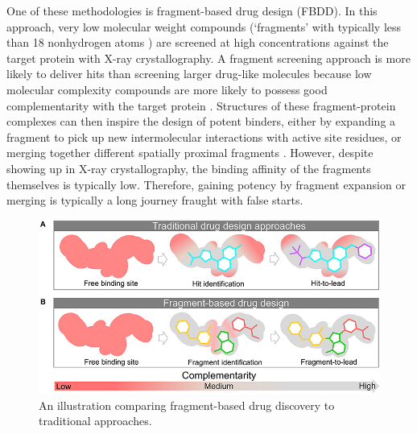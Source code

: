 One of these methodologies is fragment-based drug design (FBDD). In this approach, very low molecular weight compounds (`fragments' with typically less than 18 nonhydrogen atoms \cite{David2017FBLD}) are screened at high concentrations against the target protein with X-ray crystallography. A fragment screening approach is more likely to deliver hits than screening larger drug-like molecules because low molecular complexity compounds are more likely to possess good complementarity with the target protein \cite{hann2001molecular}. Structures of these fragment-protein complexes can then inspire the design of potent binders, either by expanding a fragment to pick up new intermolecular interactions with active site residues, or merging together different spatially proximal fragments \cite{Ichihara2011FragLinking, Yu2021FragLinkingEntropy}. However, despite showing up in X-ray crystallography, the binding affinity of the fragments themselves is typically low. Therefore, gaining potency by fragment expansion or merging is typically a long journey fraught with false starts. 



\begin{figure}
    \centering
    \includegraphics[width=\linewidth]{Chapters/Fresco/Figs/fbdd_vs_trad.jpg}
    \caption{An illustration comparing fragment-based drug discovery to traditional approaches.}
    \label{fig:fbdd}
\end{figure}

